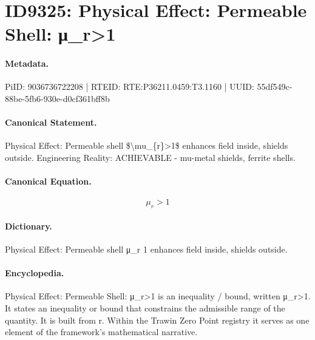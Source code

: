 \section*{ID9325: Physical Effect: Permeable Shell: μ\_r>1}
\paragraph{Metadata.}
PiID: 9036736722208 | RTEID: RTE:P36211.0459:T3.1160 | UUID: 55df549c-88be-5fb6-930e-d0cf361bff8b

\paragraph{Canonical Statement.}
Physical Effect: Permeable shell \$\textbackslash{}mu\_\{r\}>1\$ enhances field inside, shields outside. Engineering Reality: ACHIEVABLE - mu-metal shields, ferrite shells.

\paragraph{Canonical Equation.}
\[
\mu_{r}>1
\]

\paragraph{Dictionary.}
Physical Effect: Permeable shell μ\_r 1 enhances field inside, shields outside.

\paragraph{Encyclopedia.}
Physical Effect: Permeable Shell: μ\_r>1 is an inequality / bound, written μ\_r>1. It states an inequality or bound that constrains the admissible range of the quantity. It is built from r. Within the Trawin Zero Point registry it serves as one element of the framework's mathematical narrative.
